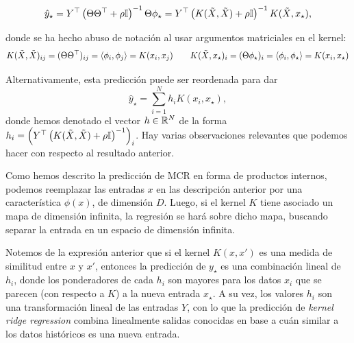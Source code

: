 \begin{equation}
    \hat{y}_\star = Y^\top \left(\Theta\Theta^\top + \rho{\mathbb I}\right)^{-1}\Theta \phi_\star  = Y^\top \left(K(\tilde{X},\tilde{X}) + \rho{\mathbb I}\right) ^{-1} K(\tilde{X}, x_\star),    
\end{equation}

donde se ha hecho abuso de notación al usar argumentos matriciales en el kernel:
\begin{equation}
	K(\tilde{X},\tilde{X})_{ij} = (\Theta\Theta^\top)_{ij} = \langle\phi_i,\phi_j\rangle = K(x_i,x_j)\qquad K(\tilde{X},x_\star)_i = (\Theta\phi_\star)_i = \langle\phi_i,\phi_\star\rangle = K(x_i,x_\star)
\end{equation}

Alternativamente, esta predicción puede ser reordenada para dar 
\begin{equation}
   \hat{y}_\star    = \sum_{i=1}^N h_i K(x_i,x_\star)\label{eq:RR_pred2},
\end{equation}
donde hemos denotado el vector $h\in\mathbb{R}^N$ de la forma $h_i = \left(Y^\top \left(K(\tilde{X},\tilde{X}) + \rho{\mathbb I}\right) ^{-1}\right)_i$. Hay varias observaciones relevantes que podemos hacer con respecto al resultado anterior. 

\begin{remark}
Como hemos descrito la predicción de MCR en forma de productos internos, podemos reemplazar las entradas $x$ en las descripción anterior por una característica $\phi(x)$, de dimensión $D$. Luego, si el kernel $K$ tiene asociado un mapa de dimensión infinita, la regresión se hará sobre dicho mapa, buscando separar la entrada en un espacio de dimensión infinita. 
\end{remark}


\begin{remark}
    Notemos de la expresión anterior que si el kernel $K(x,x')$ es una medida de similitud entre $x$ y $x'$, entonces la predicción de $y_\star$ es una combinación lineal de $h_i$, donde los ponderadores de cada $h_i$ son mayores para los datos $x_i$ que se parecen (con respecto a $K$) a la nueva entrada $x_\star$. A su vez, los valores $h_i$ son una transformación lineal de las entradas $Y$, con lo que la predicción de \emph{kernel ridge regression} combina linealmente salidas conocidas en base a cuán similar a los datos históricos es una nueva entrada. 
\end{remark}

